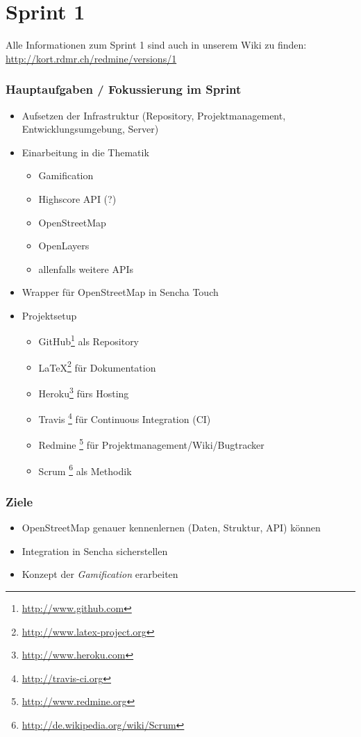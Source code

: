 \section{Sprint 1}


Alle Informationen zum Sprint 1 sind auch in unserem Wiki zu finden:
\url{http://kort.rdmr.ch/redmine/versions/1}

\subsubsection{Hauptaufgaben / Fokussierung im Sprint}

\begin{itemize}
	\item Aufsetzen der Infrastruktur (Repository, Projektmanagement, Entwicklungsumgebung, Server)
	\item Einarbeitung in die Thematik
	\begin{itemize}
		\item Gamification
		\item Highscore API (?)
		\item OpenStreetMap
		\item OpenLayers
		\item allenfalls weitere \gls{API}s
	\end{itemize}
	\item Wrapper für OpenStreetMap in Sencha Touch
	\item Projektsetup
	\begin{itemize}
		\item GitHub\footnote{\url{http://www.github.com}} als Repository
		\item \LaTeX{}\footnote{\url{http://www.latex-project.org}} für Dokumentation
		\item Heroku\footnote{\url{http://www.heroku.com}} fürs Hosting
		\item Travis \footnote{\url{http://travis-ci.org}} für Continuous Integration (CI)
		\item Redmine \footnote{\url{http://www.redmine.org}} für Projektmanagement/Wiki/Bugtracker
		\item Scrum \footnote{\url{http://de.wikipedia.org/wiki/Scrum}} als Methodik
	\end{itemize}
\end{itemize}

\subsubsection{Ziele}
\begin{itemize}
	\item OpenStreetMap genauer kennenlernen (Daten, Struktur, API) können
	\item Integration in Sencha sicherstellen
	\item Konzept der \emph{Gamification} erarbeiten
\end{itemize}


